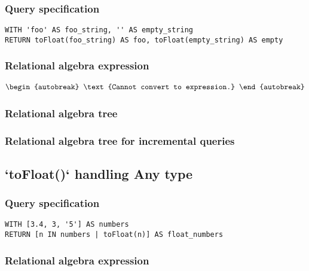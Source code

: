 \subsubsection*{Query specification}

\begin{lstlisting}
WITH 'foo' AS foo_string, '' AS empty_string
RETURN toFloat(foo_string) AS foo, toFloat(empty_string) AS empty
\end{lstlisting}

\subsubsection*{Relational algebra expression}

\begin{align*}
\begin{autobreak}
\text{Cannot convert to expression.}
\end{autobreak}
\end{align*}

\subsubsection*{Relational algebra tree}


\subsubsection*{Relational algebra tree for incremental queries}


\subsection{`toFloat()` handling Any type}

\subsubsection*{Query specification}

\begin{lstlisting}
WITH [3.4, 3, '5'] AS numbers
RETURN [n IN numbers | toFloat(n)] AS float_numbers
\end{lstlisting}

\subsubsection*{Relational algebra expression}

